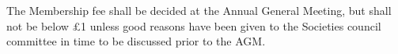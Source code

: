  The Membership fee shall be decided at the Annual General Meeting, but shall not be below \pounds 1 unless good reasons have been given to the Societies council committee in time to be discussed prior to the AGM.\ \\
